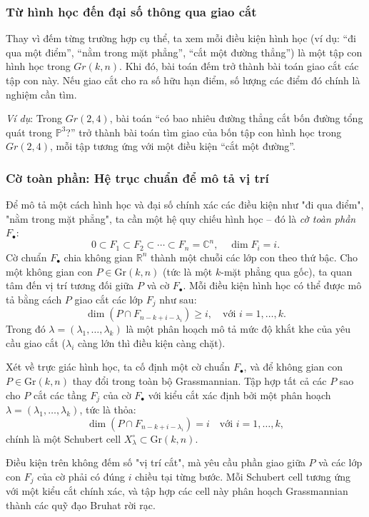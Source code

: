 \subsubsection{\textbf{Từ hình học đến đại số thông qua giao cắt}}

Thay vì đếm từng trường hợp cụ thể, ta xem mỗi điều kiện hình học (ví dụ: “đi qua một điểm”, “nằm trong mặt phẳng”, “cắt một đường thẳng”) là một tập con hình học trong $Gr(k,n)$. Khi đó, bài toán đếm trở thành bài toán giao cắt các tập con này. Nếu giao cắt cho ra số hữu hạn điểm, số lượng các điểm đó chính là nghiệm cần tìm.

\textit{Ví dụ}: Trong $Gr(2,4)$, bài toán “có bao nhiêu đường thẳng cắt bốn đường tổng quát trong $\mathbb{P}^3$?” trở thành bài toán tìm giao của bốn tập con hình học trong $Gr(2,4)$, mỗi tập tương ứng với một điều kiện “cắt một đường”.

\subsubsection{\textbf{Cờ toàn phần: Hệ trục chuẩn để mô tả vị trí}}

Để mô tả một cách hình học và đại số chính xác các điều kiện như "đi qua điểm", "nằm trong mặt phẳng", ta cần một hệ quy chiếu hình học – đó là \textit{cờ toàn phần} $F_\bullet$:
$$
0 \subset F_1 \subset F_2 \subset \cdots \subset F_n = \mathbb{C}^n, \quad \dim F_i = i. 
$$
Cờ chuẩn $F_\bullet$ chia không gian $\mathbb{R}^n$ thành một chuỗi các lớp con theo thứ bậc. Cho một không gian con $P \in \mathrm{Gr}(k,n)$ (tức là một $k$-mặt phẳng qua gốc), ta quan tâm đến vị trí tương đối giữa $P$ và cờ $F_\bullet$. Mỗi điều kiện hình học có thể được mô tả bằng cách $P$ giao cắt các lớp $F_j$ như sau:
$$
\dim(P \cap F_{n - k + i - \lambda_i}) \geq i, \quad \text{với } i = 1,\dots,k.
$$
Trong đó $\lambda = (\lambda_1, \dots, \lambda_k)$ là một phân hoạch mô tả mức độ khắt khe của yêu cầu giao cắt ($\lambda_i$ càng lớn thì điều kiện càng chặt).

Xét về trực giác hình học, ta cố định một cờ chuẩn $F_\bullet$, và để không gian con $P \in \mathrm{Gr}(k,n)$ thay đổi trong toàn bộ Grassmannian. Tập hợp tất cả các $P$ sao cho $P$ cắt các tầng $F_j$ của cờ $F_\bullet$ với kiểu cắt xác định bởi một phân hoạch $\lambda = (\lambda_1, \dots, \lambda_k)$, tức là thỏa:
$$
\dim(P \cap F_{n - k + i - \lambda_i}) = i \quad \text{với } i = 1,\dots,k,
$$
chính là một Schubert cell $X^\circ_\lambda \subset \mathrm{Gr}(k,n)$.

Điều kiện trên không đếm số "vị trí cắt", mà yêu cầu phần giao giữa $P$ và các lớp con $F_j$ của cờ phải có đúng $i$ chiều tại từng bước. Mỗi Schubert cell tương ứng với một kiểu cắt chính xác, và tập hợp các cell này phân hoạch Grassmannian thành các quỹ đạo Bruhat rời rạc.

